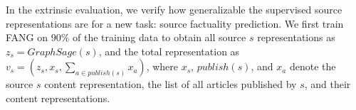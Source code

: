 \documentclass[sigconf]{acmart}
\theoremstyle{definition}
\theoremstyle{hypothesis}
\begin{document}
In the extrinsic evaluation, we verify how generalizable the supervised source representations are for a new task: source factuality prediction. We first train FANG on 90\% of the training data to obtain all source $s$ representations as $z_s=GraphSage(s)$, and the total representation as $v_s=(z_s,x_s,\sum_{a\in publish(s)}x_a)$, where $x_s$, $publish(s)$, and $x_a$ denote the source $s$ content representation, the list of all articles published by $s$, and their content representations. 

\begin{figure}[t]
\centering
{}
\\

\end{figure}
\end{document}

